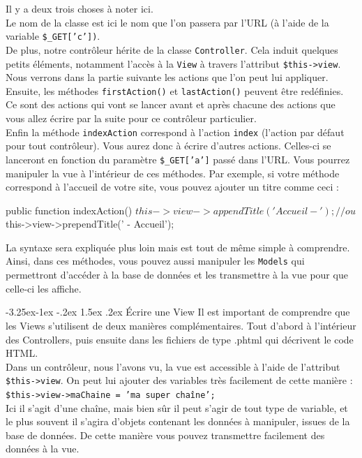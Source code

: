 \documentclass[a4paper,11pt]{article}
\makeatletter
\renewcommand{\subsection}{\@startsection{subsection}{2}{\z@}%
             {-3.25ex\@plus -1ex \@minus -.2ex}%
             {1.5ex \@plus .2ex}%
             {\color{bleuFonce}\normalfont\large\bfseries}}
\makeatother
\begin{document}
Il y a deux trois choses à noter ici.\\

Le nom de la classe est ici le nom que l'on passera par l'URL (à l'aide de la variable \texttt{\$\_GET['c'])}.\\

De plus, notre contrôleur hérite de la classe \texttt{Controller}. Cela induit quelques petits éléments, notamment l'accès à la \texttt{View} à travers l'attribut \texttt{\$this->view}. Nous verrons dans la partie suivante les actions que l'on peut lui appliquer. Ensuite, les méthodes \texttt{firstAction()} et \texttt{lastAction()} peuvent être redéfinies. Ce sont des actions qui vont se lancer avant et après chacune des actions que vous allez écrire par la suite pour ce contrôleur particulier.\\

Enfin la méthode \texttt{indexAction} correspond à l'action \texttt{index} (l'action par défaut pour tout contrôleur). Vous aurez donc à écrire d'autres actions. Celles-ci se lanceront en fonction du paramètre \texttt{\$\_GET['a']} passé dans l'URL. Vous pourrez manipuler la vue à l'intérieur de ces méthodes. Par exemple, si votre méthode correspond à l'accueil de votre site, vous pouvez ajouter un titre comme ceci :
\begin{PHP}
public function indexAction() {
  $this->view->appendTitle('Accueil - ');
  // ou
  $this->view->prependTitle(' - Accueil');
}
\end{PHP}

La syntaxe sera expliquée plus loin mais est tout de même simple à comprendre.\\

Ainsi, dans ces méthodes, vous pouvez aussi manipuler les \texttt{Models} qui permettront d'accéder à la base de données et les transmettre à la vue pour que celle-ci les affiche.

\subsection{Écrire une View}
Il est important de comprendre que les Views s'utilisent de deux manières complémentaires. Tout d'abord à l'intérieur des Controllers, puis ensuite dans les fichiers de type .phtml qui décrivent le code HTML.\\

Dans un contrôleur, nous l'avons vu, la vue est accessible à l'aide de l'attribut \texttt{\$this->view}. On peut lui ajouter des variables très facilement de cette manière : \texttt{\$this->view->maChaine = 'ma super chaîne';}\\
Ici il s'agit d'une chaîne, mais bien sûr il peut s'agir de tout type de variable, et le plus souvent il s'agira d'objets contenant les données à manipuler, issues de la base de données. De cette manière vous pouvez transmettre facilement des données à la vue.\\
\end{document}
